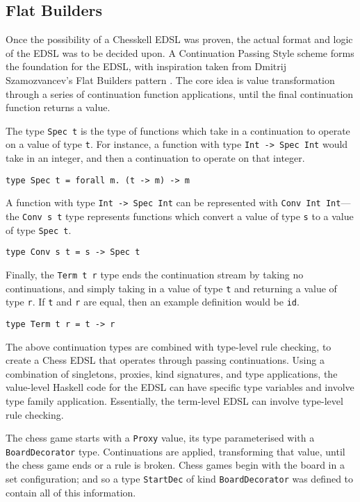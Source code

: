 \documentclass[12pt, a4paper, bibliography=totocnumbered]{scrreprt}
\newcommand{\inline}[1]{\lstinline[basicstyle=\ttfamily\footnotesize]{#1}}
\begin{document}
\subsection{Flat Builders}

Once the possibility of a Chesskell EDSL was proven, the actual format and logic of the EDSL was to be decided upon. A Continuation Passing Style \cite{cps} scheme forms the foundation for the EDSL, with inspiration taken from Dmitrij Szamozvancev's Flat Builders pattern \cite{mezzo}. The core idea is value transformation through a series of continuation function applications, until the final continuation function returns a value.

The type \inline{Spec t} is the type of functions which take in a continuation to operate on a value of type \inline{t}. For instance, a function with type \inline{Int -> Spec Int} would take in an integer, and then a continuation to operate on that integer.

\begin{lstlisting}
type Spec t = forall m. (t -> m) -> m
\end{lstlisting}

A function with type \inline{Int -> Spec Int} can be represented with \inline{Conv Int Int}---the \inline{Conv s t} type represents functions which convert a value of type \inline{s} to a value of type \inline{Spec t}.

\begin{lstlisting}
type Conv s t = s -> Spec t
\end{lstlisting}

Finally, the \inline{Term t r} type ends the continuation stream by taking no continuations, and simply taking in a value of type \inline{t} and returning a value of type \inline{r}. If \inline{t} and \inline{r} are equal, then an example definition would be \inline{id}.

\begin{lstlisting}
type Term t r = t -> r
\end{lstlisting}

The above continuation types are combined with type-level rule checking, to create a Chess EDSL that operates through passing continuations. Using a combination of singletons, proxies, kind signatures, and type applications, the value-level Haskell code for the EDSL can have specific type variables and involve type family application. Essentially, the term-level EDSL can involve type-level rule checking.

The chess game starts with a \inline{Proxy} value, its type parameterised with a \inline{BoardDecorator} type. Continuations are applied, transforming that value, until the chess game ends or a rule is broken. Chess games begin with the board in a set configuration; and so a type \inline{StartDec} of kind \inline{BoardDecorator} was defined to contain all of this information.
\end{document}
